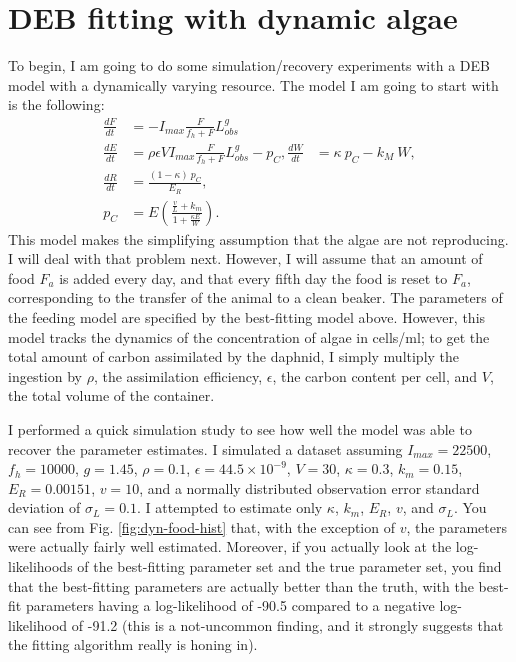 \documentclass[12pt,reqno,final,pdftex]{amsart}\usepackage[]{graphicx}\usepackage[]{color}
\theoremstyle{plain}
\numberwithin{equation}{part}
\begin{document}
\section*{DEB fitting with dynamic algae}
To begin, I am going to do some simulation/recovery experiments with a DEB model with a dynamically varying resource.
The model I am going to start with is the following:
\begin{align}
\frac{dF}{dt} &= -I_{max} \frac{F}{f_h+F} L_{obs}^g \\
\frac{dE}{dt} &= \rho \epsilon V I_{max} \frac{F}{f_h+F} L_{obs}^g - p_C,
\frac{dW}{dt} &= \kappa~p_C - k_M~W, \\
\frac{dR}{dt} &= \frac{(1-\kappa)~p_C}{E_R}, \\
p_C &= E \left(\frac{\frac{v}{L} + k_m}{1+\frac{\kappa E}{W}}\right).
\end{align}
This model makes the simplifying assumption that the algae are not reproducing.
I will deal with that problem next.
However, I will assume that an amount of food $F_{a}$ is added every day, and that every fifth day the food is reset to $F_{a}$, corresponding to the transfer of the animal to a clean beaker.
The parameters of the feeding model are specified by the best-fitting model above.
However, this model tracks the dynamics of the concentration of algae in cells/ml; to get the total amount of carbon assimilated by the daphnid, I simply multiply the ingestion by $\rho$, the assimilation efficiency, $\epsilon$, the carbon content per cell, and $V$, the total volume of the container.

I performed a quick simulation study to see how well the model was able to recover the parameter estimates.
I simulated a dataset assuming $I_{max}=22500$, $f_h=10000$, $g=1.45$, $\rho=0.1$, $\epsilon = 44.5\times10^{-9}$, $V=30$, $\kappa=0.3$, $k_m=0.15$, $E_R=0.00151$, $v=10$, and a normally distributed observation error standard deviation of $\sigma_L=0.1$.
I attempted to estimate only $\kappa$, $k_m$, $E_R$, $v$, and $\sigma_L$.
You can see from Fig. \ref{fig:dyn-food-hist} that, with the exception of $v$, the parameters were actually fairly well estimated.
Moreover, if you actually look at the log-likelihoods of the best-fitting parameter set and the true parameter set, you find that the best-fitting parameters are actually better than the truth, with the best-fit parameters having a log-likelihood of -90.5 compared to a negative log-likelihood of -91.2 (this is a not-uncommon finding, and it strongly suggests that the fitting algorithm really is honing in).
\end{document}
